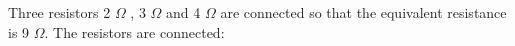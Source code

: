 Three resistors 2 $\Omega$ , 3 $\Omega$ and 4 $\Omega$ are connected 
so that the equivalent resistance is 9 $\Omega$. 
The resistors are connected: